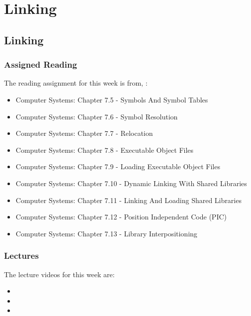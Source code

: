 \clearpage

\renewcommand{\ChapTitle}{Linking}
\renewcommand{\SectionTitle}{Linking}

\chapter{\ChapTitle}

\section{\SectionTitle}

\subsection{Assigned Reading}

The reading assignment for this week is from, \Textbook:

\begin{itemize}
    \item Computer Systems: Chapter 7.5 - Symbols And Symbol Tables
    \item Computer Systems: Chapter 7.6 - Symbol Resolution
    \item Computer Systems: Chapter 7.7 - Relocation
    \item Computer Systems: Chapter 7.8 - Executable Object Files
    \item Computer Systems: Chapter 7.9 - Loading Executable Object Files
    \item Computer Systems: Chapter 7.10 - Dynamic Linking With Shared Libraries
    \item Computer Systems: Chapter 7.11 - Linking And Loading Shared Libraries
    \item Computer Systems: Chapter 7.12 - Position Independent Code (PIC)
    \item Computer Systems: Chapter 7.13 - Library Interpositioning
\end{itemize}

\subsection{Lectures}

The lecture videos for this week are:

\begin{itemize}
    \item {}
    \item {}
    \item {}
\end{itemize}

